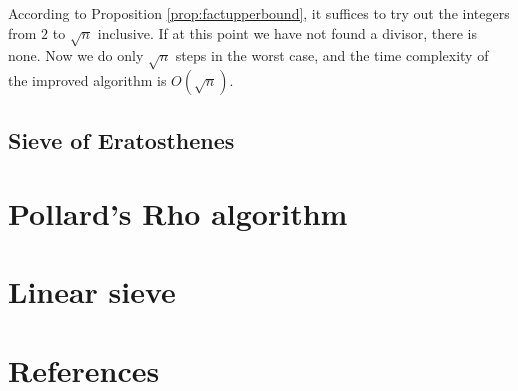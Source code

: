 \documentclass[12pt] {article}
\theoremstyle{plain}
\theoremstyle{definition}
\begin{document}
According to Proposition \ref{prop:factupperbound}, it suffices to try out the integers from $2$ to $\sqrt{n}$ inclusive. If at this point we have not found a divisor, there is none. Now we do only $\sqrt{n}$ steps in the worst case, and the time complexity of the improved algorithm is $O(\sqrt{n})$.

\subsection {Sieve of Eratosthenes}

\section {Pollard's Rho algorithm}

\section {Linear sieve}

\section {References}
\end{document}
